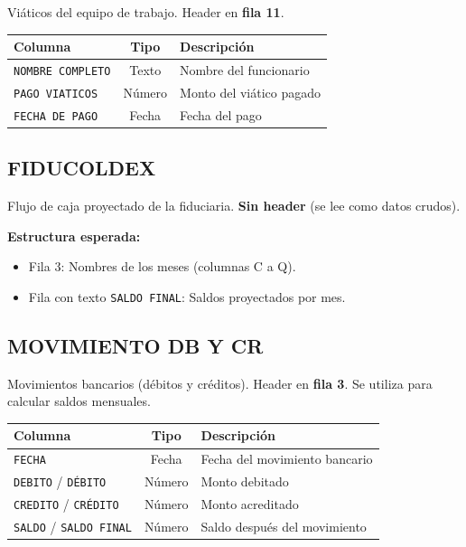 \documentclass[11pt,a4paper]{article}
\begin{document}
Viáticos del equipo de trabajo. Header en \textbf{fila 11}.

\begin{center}
\renewcommand{\arraystretch}{1.3}
\begin{tabular}{|l|c|p{7cm}|}
\hline
\rowcolor{verde!15}
\textbf{Columna} & \textbf{Tipo} & \textbf{Descripción} \\
\hline
\texttt{NOMBRE COMPLETO} & Texto & Nombre del funcionario \\
\hline
\texttt{PAGO VIATICOS} & Número & Monto del viático pagado \\
\hline
\texttt{FECHA DE PAGO} & Fecha & Fecha del pago \\
\hline
\end{tabular}
\end{center}

\subsection{FIDUCOLDEX}

Flujo de caja proyectado de la fiduciaria. \textbf{Sin header} (se lee como datos crudos).

\begin{tcolorbox}[colback=verde!5, colframe=verde]
\textbf{Estructura esperada:}
\begin{itemize}[noitemsep]
    \item Fila 3: Nombres de los meses (columnas C a Q).
    \item Fila con texto \texttt{SALDO FINAL}: Saldos proyectados por mes.
\end{itemize}
\end{tcolorbox}

\subsection{MOVIMIENTO DB Y CR}

Movimientos bancarios (débitos y créditos). Header en \textbf{fila 3}. Se utiliza para calcular saldos mensuales.

\begin{center}
\renewcommand{\arraystretch}{1.3}
\begin{tabular}{|l|c|p{7cm}|}
\hline
\rowcolor{verde!15}
\textbf{Columna} & \textbf{Tipo} & \textbf{Descripción} \\
\hline
\texttt{FECHA} & Fecha & Fecha del movimiento bancario \\
\hline
\texttt{DEBITO} / \texttt{D\'{E}BITO} & Número & Monto debitado \\
\hline
\texttt{CREDITO} / \texttt{CR\'{E}DITO} & Número & Monto acreditado \\
\hline
\texttt{SALDO} / \texttt{SALDO FINAL} & Número & Saldo después del movimiento \\
\hline
\end{tabular}
\end{center}
\end{document}
